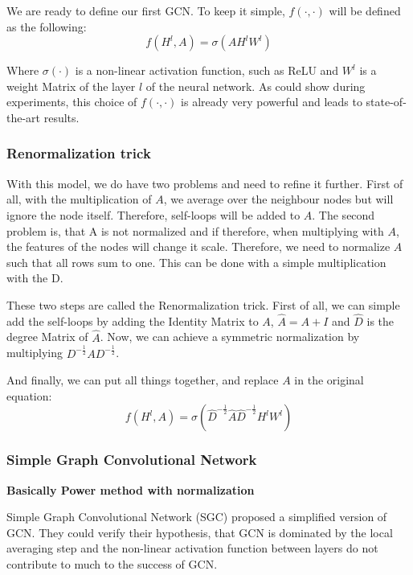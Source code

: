 We are ready to define our first GCN. To keep it simple, $f(\cdot,\cdot)$ will be defined as the following:
\begin{equation}
    f( H^l, A) = \sigma (A H^l W^l)
\end{equation} 

Where $\sigma ( \cdot )$ is a non-linear activation function, such as ReLU and $W^l$ is
a weight Matrix of the layer $l$ of the neural network. As \citet{GCN} could show during experiments,
this choice of $f(\cdot,\cdot)$ is already very powerful and leads to state-of-the-art results.

\subsubsection{Renormalization trick}

With this model, we do have two problems and need to refine it further.
First of all, with the multiplication of $A$, we average over the neighbour nodes but
will ignore the node itself. Therefore, self-loops will be added to $A$.
The second problem is, that A is not normalized and if therefore, when multiplying with $A$,
the features of the nodes will change it scale. Therefore, we need to normalize $A$
such that all rows sum to one. This can be done with a simple multiplication with the D.

These two steps are called the Renormalization trick\cite{GCN}.
First of all, we can simple add the self-loops by adding the Identity Matrix to $A$, 
$\hat{A} = A + I$ and $\hat{D}$ is the degree Matrix of $\hat{A}$.
Now, we can achieve a symmetric normalization by multiplying $D^{-\frac{1}{2}} A D^{-\frac{1}{2}}$.

And finally, we can put all things together, and replace $A$ in the original equation:
\begin{equation}
    f( H^l, A) = \sigma (\hat{D}^{-\frac{1}{2}} \hat{A} \hat{D}^{-\frac{1}{2}} H^l W^l)
\end{equation} 


\subsubsection{Simple Graph Convolutional Network}
\textbf{Basically Power method with normalization}

Simple Graph Convolutional Network (SGC) \cite{simpleGCN} proposed a simplified version of GCN.
They could verify their hypothesis, that GCN is dominated by the local averaging step and the non-linear 
activation function between layers do not contribute to much to the success of GCN.

